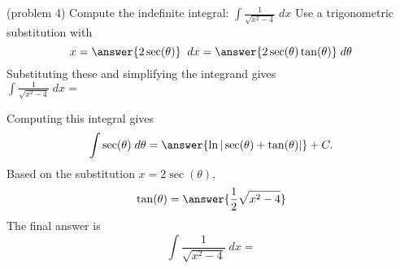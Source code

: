 \documentclass{ximera}
\begin{document}
\begin{problem}(problem 4)
Compute the indefinite integral: $\displaystyle{\int   \frac{1}{\sqrt{x^2 - 4}} \; dx}$
Use a trigonometric substitution with\\
\[
x = \answer{2\sec(\theta)} \;\; dx = \answer{2\sec(\theta)\tan(\theta)} \; d\theta
\]
Substituting these and simplifying the integrand gives\\
$\displaystyle{\int   \frac{1}{\sqrt{x^2 - 4}}\; dx =}$\\
\begin{multipleChoice}
\end{multipleChoice}

Computing this integral gives
\[
\int \sec(\theta) \; d\theta = \answer{\ln|\sec(\theta) + \tan(\theta)|} + C.
\]
Based on the substitution $x = 2\sec(\theta)$, \\
\[
\tan(\theta) = \answer{\frac12\sqrt{x^2-4}}
\]
The final answer is
\[
\int   \frac{1}{\sqrt{x^2 - 4}}\; dx = 
\]
\begin{center}
\begin{multipleChoice}
\end{multipleChoice}
\end{center}


\end{problem}
\end{document}
